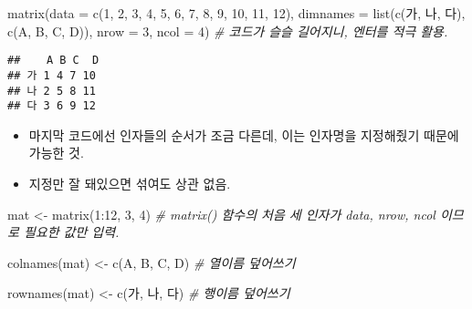 \documentclass[
  12,
]{article}
\newenvironment{Shaded}{\begin{snugshade}}{\end{snugshade}}
\newcommand{\AttributeTok}[1]{\textcolor[rgb]{0.77,0.63,0.00}{#1}}
\newcommand{\CommentTok}[1]{\textcolor[rgb]{0.56,0.35,0.01}{\textit{#1}}}
\newcommand{\DecValTok}[1]{\textcolor[rgb]{0.00,0.00,0.81}{#1}}
\newcommand{\FunctionTok}[1]{\textcolor[rgb]{0.00,0.00,0.00}{#1}}
\newcommand{\NormalTok}[1]{#1}
\newcommand{\OtherTok}[1]{\textcolor[rgb]{0.56,0.35,0.01}{#1}}
\newcommand{\SpecialCharTok}[1]{\textcolor[rgb]{0.00,0.00,0.00}{#1}}
\newcommand{\StringTok}[1]{\textcolor[rgb]{0.31,0.60,0.02}{#1}}
\begin{document}
\begin{Shaded}
\begin{Highlighting}[]
\FunctionTok{matrix}\NormalTok{(}\AttributeTok{data =} \FunctionTok{c}\NormalTok{(}\DecValTok{1}\NormalTok{, }\DecValTok{2}\NormalTok{, }\DecValTok{3}\NormalTok{, }\DecValTok{4}\NormalTok{, }\DecValTok{5}\NormalTok{, }\DecValTok{6}\NormalTok{, }\DecValTok{7}\NormalTok{, }\DecValTok{8}\NormalTok{, }\DecValTok{9}\NormalTok{, }\DecValTok{10}\NormalTok{, }\DecValTok{11}\NormalTok{, }\DecValTok{12}\NormalTok{),}
       \AttributeTok{dimnames =} \FunctionTok{list}\NormalTok{(}\FunctionTok{c}\NormalTok{(}\StringTok{\textquotesingle{}가\textquotesingle{}}\NormalTok{, }\StringTok{\textquotesingle{}나\textquotesingle{}}\NormalTok{, }\StringTok{\textquotesingle{}다\textquotesingle{}}\NormalTok{), }\FunctionTok{c}\NormalTok{(}\StringTok{\textquotesingle{}A\textquotesingle{}}\NormalTok{, }\StringTok{\textquotesingle{}B\textquotesingle{}}\NormalTok{, }\StringTok{\textquotesingle{}C\textquotesingle{}}\NormalTok{, }\StringTok{\textquotesingle{}D\textquotesingle{}}\NormalTok{)),}
       \AttributeTok{nrow =} \DecValTok{3}\NormalTok{, }\AttributeTok{ncol =} \DecValTok{4}\NormalTok{) }\CommentTok{\# 코드가 슬슬 길어지니, 엔터를 적극 활용.}
\end{Highlighting}
\end{Shaded}

\begin{verbatim}
##    A B C  D
## 가 1 4 7 10
## 나 2 5 8 11
## 다 3 6 9 12
\end{verbatim}

\begin{itemize}
\item
  마지막 코드에선 인자들의 순서가 조금 다른데, 이는 인자명을 지정해줬기
  때문에 가능한 것.
\item
  지정만 잘 돼있으면 섞여도 상관 없음.
\end{itemize}

\begin{Shaded}
\begin{Highlighting}[]
\NormalTok{mat }\OtherTok{\textless{}{-}} \FunctionTok{matrix}\NormalTok{(}\DecValTok{1}\SpecialCharTok{:}\DecValTok{12}\NormalTok{, }\DecValTok{3}\NormalTok{, }\DecValTok{4}\NormalTok{) }\CommentTok{\# matrix() 함수의 처음 세 인자가 data, nrow, ncol 이므로 필요한 값만 입력.}

\FunctionTok{colnames}\NormalTok{(mat) }\OtherTok{\textless{}{-}} \FunctionTok{c}\NormalTok{(}\StringTok{\textquotesingle{}A\textquotesingle{}}\NormalTok{, }\StringTok{\textquotesingle{}B\textquotesingle{}}\NormalTok{, }\StringTok{\textquotesingle{}C\textquotesingle{}}\NormalTok{, }\StringTok{\textquotesingle{}D\textquotesingle{}}\NormalTok{) }\CommentTok{\# 열이름 덮어쓰기}

\FunctionTok{rownames}\NormalTok{(mat) }\OtherTok{\textless{}{-}} \FunctionTok{c}\NormalTok{(}\StringTok{\textquotesingle{}가\textquotesingle{}}\NormalTok{, }\StringTok{\textquotesingle{}나\textquotesingle{}}\NormalTok{, }\StringTok{\textquotesingle{}다\textquotesingle{}}\NormalTok{) }\CommentTok{\# 행이름 덮어쓰기}
\end{Highlighting}
\end{Shaded}
\end{document}
